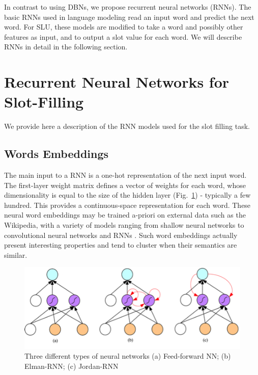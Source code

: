 In contrast to using DBNs, we propose recurrent neural networks (RNNs). The
basic RNNs used in language modeling read an input word and predict the next
word. For SLU, these models are modified to take a word and possibly other
features as input, and to output a slot value for each word. We will describe
RNNs in detail in the following section. 

\section{Recurrent Neural Networks for Slot-Filling}
\label{sec:rnnsf}

We provide here a description of the RNN models used for the slot filling task. 

\subsection{Words Embeddings}

The main input to a RNN is a one-hot representation of the next input word. The
first-layer weight matrix defines a vector of weights for each word, whose
dimensionality is equal to the size of the hidden layer (Fig.~\ref{fig:rnn}) - typically a
few hundred. This provides a continuous-space representation for each word.
These neural word embeddings \citep{rnn26} may be trained a-priori on external data such
as the Wikipedia, with a variety of models ranging from shallow neural networks
\citep{rnn21} to convolutional neural networks \citep{rnn20} and RNNs \citep{rnn22}. Such word embeddings
actually present interesting properties \citep{rnn23} and tend to cluster \citep{rnn20} when
their semantics are similar.

\begin{figure}[t]
\begin{center}
\includegraphics[width=.8\linewidth]{article4/images/rnn.png}
\caption{\label{fig:rnn} Three different types of neural networks 
(a) Feed-forward NN; (b) Elman-RNN; (c) Jordan-RNN}
\vspace{-0.2in}
\end{center}
\vspace*{-1mm}
\end{figure}


